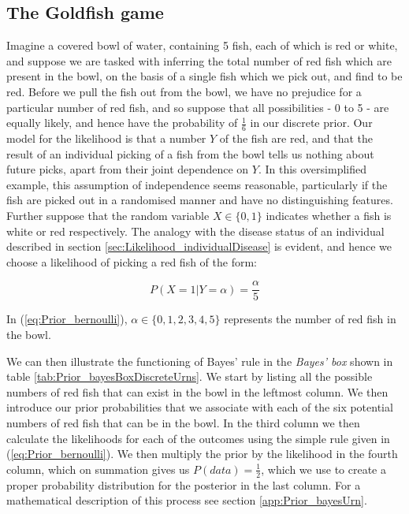 \documentclass[11pt,fullpage]{book}
\begin{document}
\subsection{The Goldfish game}\label{sec:Prior_urn}
Imagine a covered bowl of water, containing 5 fish, each of which is red or white, and suppose we are tasked with inferring the total number of red fish which are present in the bowl, on the basis of a single fish which we pick out, and find to be red. Before we pull the fish out from the bowl, we have no prejudice for a particular number of red fish, and so suppose that all possibilities - 0 to 5 - are equally likely, and hence have the probability of $\frac{1}{6}$ in our discrete prior. Our model for the likelihood is that a number $Y$ of the fish are red, and that the result of an individual picking of a fish from the bowl tells us nothing about future picks, apart from their joint dependence on $Y$. In this oversimplified example, this assumption of independence seems reasonable, particularly if the fish are picked out in a randomised manner and have no distinguishing features. Further suppose that the random variable $X\in\{0,1\}$ indicates whether a fish is white or red respectively.  The analogy with the disease status of an individual described in section \ref{sec:Likelihood_individualDisease} is evident, and hence we choose a likelihood of picking a red fish of the form:

\begin{equation}\label{eq:Prior_bernoulli}
P(X = 1|Y=\alpha) = \frac{\alpha}{5}
\end{equation}

In (\ref{eq:Prior_bernoulli}), $\alpha\in\{0,1,2,3,4,5\}$ represents the number of red fish in the bowl.

We can then illustrate the functioning of Bayes' rule in the \textit{Bayes' box} shown in table \ref{tab:Prior_bayesBoxDiscreteUrns}. We start by listing all the possible numbers of red fish that can exist in the bowl in the leftmost column. We then introduce our prior probabilities that we associate with each of the six potential numbers of red fish that can be in the bowl. In the third column we then calculate the likelihoods for each of the outcomes using the simple rule given in (\ref{eq:Prior_bernoulli}). We then multiply the prior by the likelihood in the fourth column, which on summation gives us $P(data)=\frac{1}{2}$, which we use to create a proper probability distribution for the posterior in the last column. For a mathematical description of this process see section \ref{app:Prior_bayesUrn}.
\end{document}
